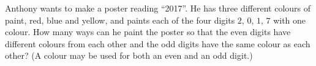 Anthony wants to make a poster reading ``2017''. He has three different colours of paint, red, blue and yellow, and paints each of the four digits $2$, $0$, $1$, $7$ with one colour. How many ways can he paint the poster so that the even digits have different colours from each other and the odd digits have the same colour as each other? (A colour may be used for both an even and an odd digit.)
